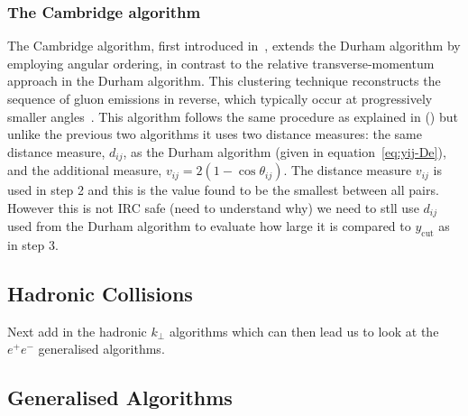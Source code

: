 \subsubsection{The Cambridge algorithm}
The Cambridge algorithm, first introduced in~\cite{Dokshitzer:1997in}, extends the Durham algorithm by employing angular ordering, in contrast to the relative transverse-momentum approach in the Durham algorithm. This clustering technique reconstructs the sequence of gluon emissions in reverse, which typically occur at progressively smaller angles~\cite{Banfi:2016yyq}. This algorithm follows the same procedure as explained in () but unlike the previous two algorithms it uses two distance measures: the same distance measure, $d_{ij}$, as the Durham algorithm (given in equation~\ref{eq:yij-De}), and the additional measure, $v_{ij}=2(1-\cos\theta_{ij})$.
The distance measure $v_{ij}$ is used in step 2 and this is the value found to be the smallest between all pairs. However this is not IRC safe {\color{blue} (need to understand why)} we need to stll use $d_{ij}$ used from the Durham algorithm to evaluate how large it is compared to $y_{\mathrm{cut}}$ as in step 3.    
    \subsection{Hadronic Collisions}
    {\color{green} Next add in the hadronic $k_\perp$ algorithms which can then lead us to look at the $e^+e^-$ generalised algorithms.}
    
    \subsection{Generalised Algorithms}

